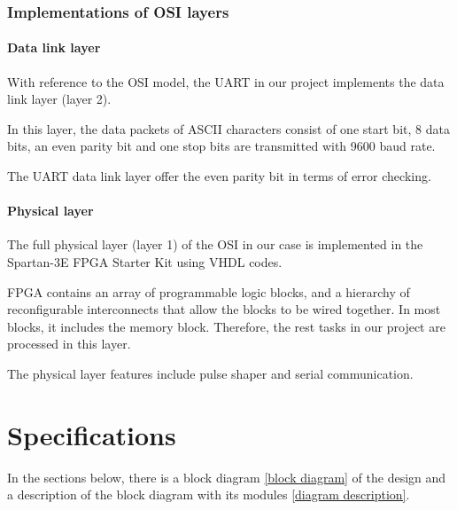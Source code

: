 \documentclass[a4paper, twoside]{report}
\begin{document}
\subsection{Implementations of OSI layers}
\subsubsection{Data link layer}
\noindent With reference to the OSI model, the UART in our project implements the data link layer (layer 2). \\ \par
\noindent In this layer, the data packets of ASCII characters consist of one start bit, 8 data bits, an even parity bit and one stop bits are transmitted with 9600 baud rate. \\ \par
\noindent The UART data link layer offer the even parity bit in terms of error checking. \\ \par
\subsubsection{Physical layer}
\noindent The full physical layer (layer 1) of the OSI in our case is implemented in the Spartan-3E FPGA Starter Kit using VHDL codes.\\ \par 
\noindent FPGA contains an array of programmable logic blocks, and a hierarchy of reconfigurable interconnects that allow the blocks
to be wired together. In most blocks, it includes the memory block. Therefore, the rest tasks in our project are processed in this layer. \\ \par  
\noindent The physical layer features include pulse shaper and serial communication. \\ \par  

\newpage
\chapter{Specifications}
In the sections below, there is a block diagram \ref{block diagram} of the design and a description of the block diagram with its modules \ref{diagram description}.\par 
\end{document}
